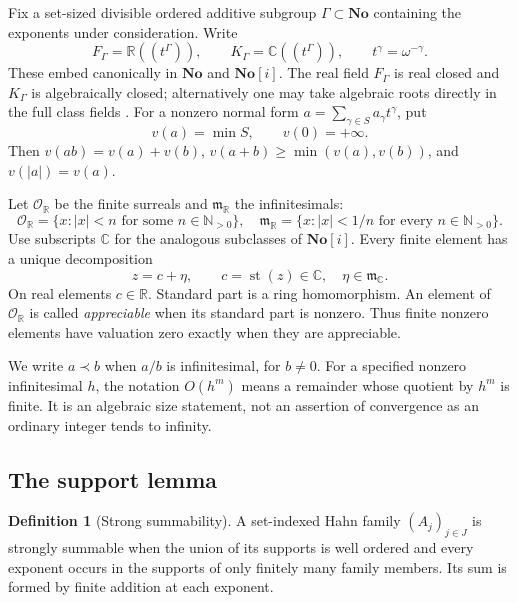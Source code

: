 \documentclass[11pt]{article}
\numberwithin{equation}{section}
\theoremstyle{definition}
\newtheorem{definition}[theorem]{Definition}
\newcommand{\No}{\mathbf{No}}
\newcommand{\SC}{\mathbf{No}[i]}
\newcommand{\R}{\mathbb R}
\newcommand{\C}{\mathbb C}
\newcommand{\N}{\mathbb N}
\newcommand{\OO}{\mathcal O}
\newcommand{\mm}{\mathfrak m}
\newcommand{\st}{\operatorname{st}}
\begin{document}
Fix a set-sized divisible ordered additive subgroup $\Gamma\subset\No$ containing the exponents under consideration. Write
\[
 F_\Gamma=\R((t^\Gamma)),\qquad
 K_\Gamma=\C((t^\Gamma)),\qquad t^\gamma=\omega^{-\gamma}.
\]
These embed canonically in $\No$ and $\SC$. The real field $F_\Gamma$ is real closed and $K_\Gamma$ is algebraically closed; alternatively one may take algebraic roots directly in the full class fields \cite{vdDE,Poonen}. For a nonzero normal form $a=\sum_{\gamma\in S}a_\gamma t^\gamma$, put
\[
 v(a)=\min S,\qquad v(0)=+\infty.
\]
Then $v(ab)=v(a)+v(b)$, $v(a+b)\ge\min(v(a),v(b))$, and $v(|a|)=v(a)$.

Let $\OO_{\R}$ be the finite surreals and $\mm_{\R}$ the infinitesimals:
\[
 \OO_{\R}=\{x:|x|<n\text{ for some }n\in\N_{>0}\},\quad
 \mm_{\R}=\{x:|x|<1/n\text{ for every }n\in\N_{>0}\}.
\]
Use subscripts $\C$ for the analogous subclasses of $\SC$. Every finite element has a unique decomposition
\begin{equation}\label{eq:standard}
 z=c+\eta,\qquad c=\st(z)\in\C,\quad \eta\in\mm_{\C}.
\end{equation}
On real elements $c\in\R$. Standard part is a ring homomorphism. An element of $\OO_{\R}$ is called \emph{appreciable} when its standard part is nonzero. Thus finite nonzero elements have valuation zero exactly when they are appreciable.

We write $a\prec b$ when $a/b$ is infinitesimal, for $b\ne0$. For a specified nonzero infinitesimal $h$, the notation $O(h^m)$ means a remainder whose quotient by $h^m$ is finite. It is an algebraic size statement, not an assertion of convergence as an ordinary integer tends to infinity.

\subsection{The support lemma}
\begin{definition}[Strong summability]
A set-indexed Hahn family $(A_j)_{j\in J}$ is strongly summable when the union of its supports is well ordered and every exponent occurs in the supports of only finitely many family members. Its sum is formed by finite addition at each exponent.
\end{definition}
\end{document}
